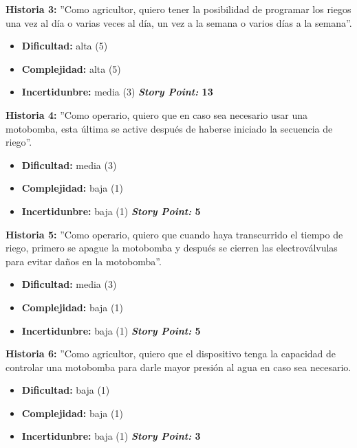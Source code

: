 \textbf{Historia 3:}
''Como agricultor, quiero tener la posibilidad de programar los riegos una vez al día o varias veces al día, un vez a la semana o varios días a la semana''.
\begin{itemize}
\item \textbf{Dificultad:} alta (5)
\item \textbf{Complejidad:} alta (5)
\item \textbf{Incertidunbre:} media (3)
\newline
\newline
\textbf{\textit{Story Point:} 13}
\end{itemize}

\textbf{Historia 4:}
''Como operario, quiero que en caso sea necesario usar una motobomba, esta última se active después de haberse iniciado la secuencia de riego''.
\begin{itemize}
\item \textbf{Dificultad:} media (3)
\item \textbf{Complejidad:} baja (1)
\item \textbf{Incertidunbre:} baja (1)
\newline
\newline
\textbf{\textit{Story Point:} 5}
\end{itemize}

\textbf{Historia 5:}
''Como operario, quiero que cuando haya transcurrido el tiempo de riego, primero se apague la motobomba y después se cierren las electroválvulas para evitar daños en la motobomba''.
\begin{itemize}
\item \textbf{Dificultad:} media (3)
\item \textbf{Complejidad:} baja (1)
\item \textbf{Incertidunbre:} baja (1)
\newline
\newline
\textbf{\textit{Story Point:} 5}
\end{itemize}

\textbf{Historia 6:}
''Como agricultor, quiero que el dispositivo tenga la capacidad de controlar una motobomba para darle mayor presión al agua en caso sea necesario.
\begin{itemize}
\item \textbf{Dificultad:} baja (1)
\item \textbf{Complejidad:} baja (1) 
\item \textbf{Incertidunbre:} baja (1) 
\newline
\newline
\textbf{\textit{Story Point:} 3}
\end{itemize}

